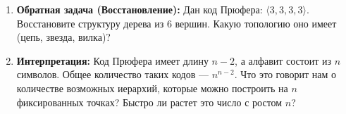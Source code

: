 \documentclass[11pt, a4paper]{extarticle}
\begin{document}
\begin{exercise}
\begin{enumerate}
\begin{enumerate}
        \item \textbf{Обратная задача (Восстановление):}
        Дан код Прюфера: $\langle 3, 3, 3, 3 \rangle$. 
        Восстановите структуру дерева из 6 вершин. Какую топологию оно имеет (цепь, звезда, вилка)?
        
        \item \textbf{Интерпретация:}
        Код Прюфера имеет длину $n-2$, а алфавит состоит из $n$ символов.
        Общее количество таких кодов — $n^{n-2}$.
        Что это говорит нам о количестве возможных иерархий, которые можно построить на $n$ фиксированных точках? Быстро ли растет это число с ростом $n$?
    \end{enumerate}
\end{enumerate}
\end{exercise}
\end{document}
